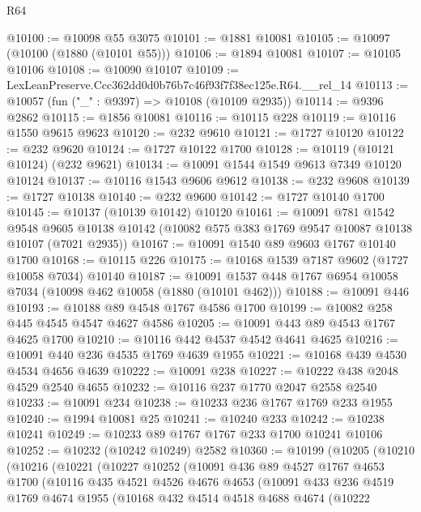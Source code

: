 \begin{lexlean}{R64}
\begin{coremodule}
@10100 := @10098 @55 @3075
@10101 := @1881 @10081
@10105 := @10097 (@10100 (@1880 (@10101 @55)))
@10106 := @1894 @10081
@10107 := @10105 @10106
@10108 := @10090 @10107
@10109 := LexLeanPreserve.Ccc362dd0d0b76b7c46f93f7f38ec125e.R64.__rel_14
@10113 := @10057 (fun ("_" : @9397) => @10108 (@10109 @2935))
@10114 := @9396 @2862
@10115 := @1856 @10081
@10116 := @10115 @228
@10119 := @10116 @1550 @9615 @9623
@10120 := @232 @9610
@10121 := @1727 @10120
@10122 := @232 @9620
@10124 := @1727 @10122 @1700
@10128 := @10119 (@10121 @10124) (@232 @9621)
@10134 := @10091 @1544 @1549 @9613 @7349 @10120 @10124
@10137 := @10116 @1543 @9606 @9612
@10138 := @232 @9608
@10139 := @1727 @10138
@10140 := @232 @9600
@10142 := @1727 @10140 @1700
@10145 := @10137 (@10139 @10142) @10120
@10161 := @10091
    @781
    @1542
    @9548
    @9605
    @10138
    @10142
    (@10082 @575 @383 @1769 @9547 @10087 @10138 @10107 (@7021 @2935))
@10167 := @10091 @1540 @89 @9603 @1767 @10140 @1700
@10168 := @10115 @226
@10175 := @10168 @1539 @7187 @9602 (@1727 @10058 @7034) @10140
@10187 := @10091 @1537 @448 @1767 @6954 @10058 @7034 (@10098 @462 @10058 (@1880 (@10101 @462)))
@10188 := @10091 @446
@10193 := @10188 @89 @4548 @1767 @4586 @1700
@10199 := @10082 @258 @445 @4545 @4547 @4627 @4586
@10205 := @10091 @443 @89 @4543 @1767 @4625 @1700
@10210 := @10116 @442 @4537 @4542 @4641 @4625
@10216 := @10091 @440 @236 @4535 @1769 @4639 @1955
@10221 := @10168 @439 @4530 @4534 @4656 @4639
@10222 := @10091 @238
@10227 := @10222 @438 @2048 @4529 @2540 @4655
@10232 := @10116 @237 @1770 @2047 @2558 @2540
@10233 := @10091 @234
@10238 := @10233 @236 @1767 @1769 @233 @1955
@10240 := @1994 @10081 @25
@10241 := @10240 @233
@10242 := @10238 @10241
@10249 := @10233 @89 @1767 @1767 @233 @1700 @10241 @10106
@10252 := @10232 (@10242 @10249) @2582
@10360 := @10199
    (@10205
      (@10210
        (@10216
          (@10221
            (@10227
              @10252
              (@10091
                @436
                @89
                @4527
                @1767
                @4653
                @1700
                (@10116
                  @435
                  @4521
                  @4526
                  @4676
                  @4653
                  (@10091
                    @433
                    @236
                    @4519
                    @1769
                    @4674
                    @1955
                    (@10168
                      @432
                      @4514
                      @4518
                      @4688
                      @4674
                      (@10222

\end{coremodule}
\end{lexlean}
